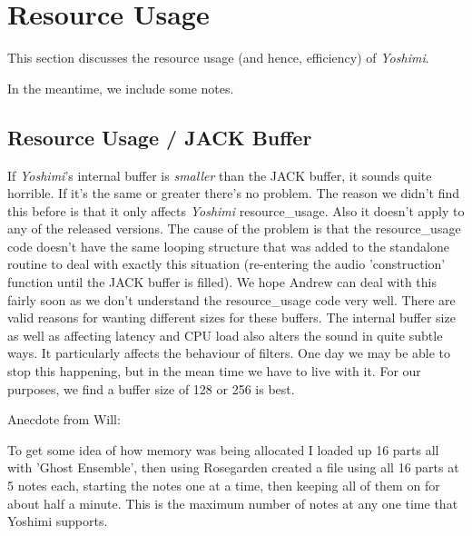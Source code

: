 %
%
%

\section{Resource Usage}
\label{sec:resource_usage}

   This section discusses the resource usage (and hence, efficiency) of
   \textsl{Yoshimi}.

   In the meantime, we include some notes.

\subsection{Resource Usage / JACK Buffer}
\label{sec:resource_usage_jack_buffer}

   If \textsl{Yoshimi}'s internal buffer is \textsl{smaller} than the JACK
   buffer, it sounds quite horrible. If it's the same or greater there's no
   problem. The reason we didn't find this before is that it only affects
   \textsl{Yoshimi} resource_usage.  Also it doesn't apply to any of the
   released versions.  The cause of the problem is that the resource_usage code
   doesn't have the same looping structure that was added to the standalone
   routine to deal with exactly this situation (re-entering the audio
   'construction' function until the JACK buffer is filled). We hope Andrew can
   deal with this fairly soon as we don't understand the resource_usage code
   very well.  There are valid reasons for wanting different sizes for these
   buffers. The internal buffer size as well as affecting latency and CPU load
   also alters the sound in quite subtle ways. It particularly affects the
   behaviour of filters.  One day we may be able to stop this happening, but in
   the mean time we have to live with it.  For our purposes, we find a buffer
   size of 128 or 256 is best.

   Anecdote from Will:

   To get some idea of how memory was being allocated I loaded up 16 parts all
   with 'Ghost Ensemble', then using Rosegarden created a file using all 16
   parts at 5 notes each, starting the notes one at a time, then keeping all of
   them on for about half a minute. This is the maximum number of notes at any
   one time that Yoshimi supports.

